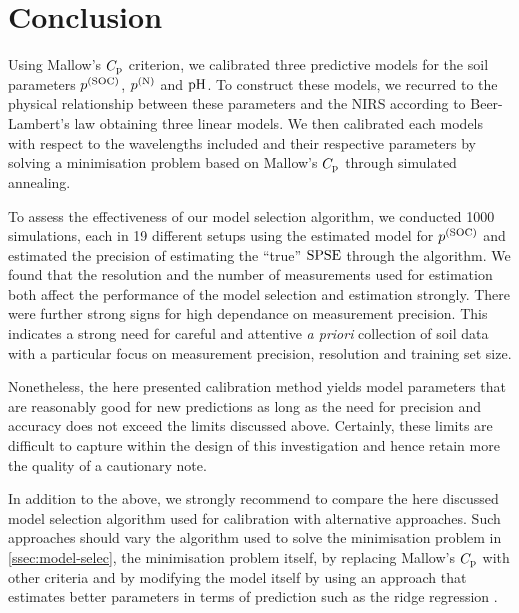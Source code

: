 \section{Conclusion}
\label{sec:conclusion}

	Using Mallow's $C_{\mathrm{p}}$ criterion, we calibrated three predictive models for the soil parameters $p^{(\mathrm{SOC})}$, $p^{(\mathrm{N})}$ and $\mathrm{pH}$.
	To construct these models, we recurred to the physical relationship between these parameters and the NIRS according to Beer-Lambert's law obtaining three linear models.
	We then calibrated each models with respect to the wavelengths included and their respective parameters by solving a minimisation problem based on Mallow's $C_{\mathrm{p}}$ through simulated annealing.
	
	To assess the effectiveness of our model selection algorithm, we conducted 1000 simulations, each in 19 different setups using the estimated model for $p^{(\mathrm{SOC})}$ and estimated the precision of estimating the \enquote{true} $\mathrm{SPSE}$ through the algorithm.
	We found that the resolution and the number of measurements used for estimation both affect the performance of the model selection and estimation strongly.
	There were further strong signs for high dependance on measurement precision.
	This indicates a strong need for careful and attentive \textsl{a priori} collection of soil data with a particular focus on measurement precision, resolution and training set size.
	
	Nonetheless, the here presented calibration method yields model parameters that are reasonably good for new predictions as long as the need for precision and accuracy does not exceed the limits discussed above.
	Certainly, these limits are difficult to capture within the design of this investigation and hence retain more the quality of a cautionary note.
	
	In addition to the above, we strongly recommend to compare the here discussed model selection algorithm used for calibration with alternative approaches.
	Such approaches should vary the algorithm used to solve the minimisation problem in \ref{ssec:model-selec}, the minimisation problem itself, by replacing Mallow's $C_{\mathrm{p}}$ with other criteria and by modifying the model itself by using an approach that estimates better parameters in terms of prediction such as the ridge regression \cite{schumacher:16b}.
	

